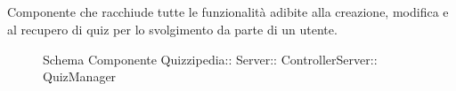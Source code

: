 \subsection{}
Componente che racchiude tutte le funzionalità adibite alla creazione, modifica e al recupero di quiz per lo svolgimento da parte di un utente.
\begin{figure}[H]
\centering
\noindent{}
\caption[Schema Componente QuizManager]{Schema Componente Quizzipedia:: Server:: ControllerServer:: QuizManager}
\end{figure}
